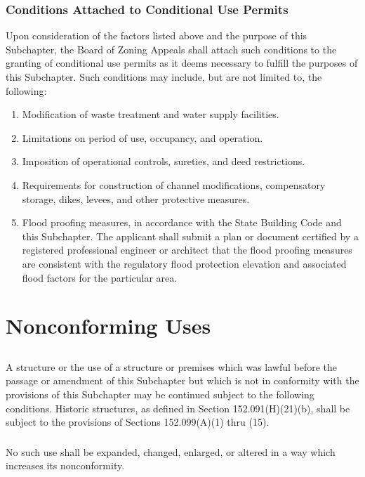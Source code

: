 \subsubsection{Conditions Attached to Conditional Use Permits}
Upon consideration of the factors listed above and the purpose of this Subchapter, the Board of Zoning Appeals shall attach such conditions to the granting of conditional use permits as it deems necessary to fulfill the purposes of this Subchapter. Such conditions may include, but are not limited to, the following:
\begin{enumerate}[{\indent}a)]
    \item Modification of waste treatment and water supply facilities.
    \item Limitations on period of use, occupancy, and operation.
    \item Imposition of operational controls, sureties, and deed restrictions.
    \item Requirements for construction of channel modifications, compensatory storage, dikes, levees, and other protective measures.
    \item Flood proofing measures, in accordance with the State Building Code and this Subchapter. The applicant shall submit a plan or document certified by a registered professional engineer or architect that the flood proofing measures are consistent with the regulatory flood protection elevation and associated flood factors for the particular area.
\end{enumerate}

\section{Nonconforming Uses}
\subsection{}
A structure or the use of a structure or premises which was lawful before the passage or amendment of this Subchapter but which is not in conformity with the provisions of this Subchapter may be continued subject to the following conditions. Historic structures, as defined in Section 152.091(H)(21)(b), shall be subject to the provisions of Sections 152.099(A)(1) thru (15).
\subsubsection{}
No such use shall be expanded, changed, enlarged, or altered in a way which increases its nonconformity.
